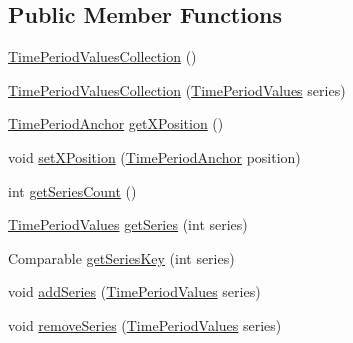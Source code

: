 \subsection*{Public Member Functions}
\begin{DoxyCompactItemize}
\item 
\mbox{\hyperlink{classorg_1_1jfree_1_1data_1_1time_1_1_time_period_values_collection_acf9def57d7c4985e34a022baeaea368b}{Time\+Period\+Values\+Collection}} ()
\item 
\mbox{\hyperlink{classorg_1_1jfree_1_1data_1_1time_1_1_time_period_values_collection_a0ddb82b9ba460887c9f09f1cba7df670}{Time\+Period\+Values\+Collection}} (\mbox{\hyperlink{classorg_1_1jfree_1_1data_1_1time_1_1_time_period_values}{Time\+Period\+Values}} series)
\item 
\mbox{\hyperlink{classorg_1_1jfree_1_1data_1_1time_1_1_time_period_anchor}{Time\+Period\+Anchor}} \mbox{\hyperlink{classorg_1_1jfree_1_1data_1_1time_1_1_time_period_values_collection_ae373cb525647af8dade90e59920acb78}{get\+X\+Position}} ()
\item 
void \mbox{\hyperlink{classorg_1_1jfree_1_1data_1_1time_1_1_time_period_values_collection_aa959881c9c70b7a2da63870fd8ebdfe4}{set\+X\+Position}} (\mbox{\hyperlink{classorg_1_1jfree_1_1data_1_1time_1_1_time_period_anchor}{Time\+Period\+Anchor}} position)
\item 
int \mbox{\hyperlink{classorg_1_1jfree_1_1data_1_1time_1_1_time_period_values_collection_a351ca777d6bd5649338306297d87c377}{get\+Series\+Count}} ()
\item 
\mbox{\hyperlink{classorg_1_1jfree_1_1data_1_1time_1_1_time_period_values}{Time\+Period\+Values}} \mbox{\hyperlink{classorg_1_1jfree_1_1data_1_1time_1_1_time_period_values_collection_a262089f3636775f2d84ebf9efec51b6f}{get\+Series}} (int series)
\item 
Comparable \mbox{\hyperlink{classorg_1_1jfree_1_1data_1_1time_1_1_time_period_values_collection_a432f205f15ffa8b9aacbcb4c77e5afd3}{get\+Series\+Key}} (int series)
\item 
void \mbox{\hyperlink{classorg_1_1jfree_1_1data_1_1time_1_1_time_period_values_collection_a7dcd1415c748630f4c2829a24d7e095b}{add\+Series}} (\mbox{\hyperlink{classorg_1_1jfree_1_1data_1_1time_1_1_time_period_values}{Time\+Period\+Values}} series)
\item 
void \mbox{\hyperlink{classorg_1_1jfree_1_1data_1_1time_1_1_time_period_values_collection_ab429d9ab476c9ce6bc69c7f6dc4a77be}{remove\+Series}} (\mbox{\hyperlink{classorg_1_1jfree_1_1data_1_1time_1_1_time_period_values}{Time\+Period\+Values}} series)

\end{DoxyCompactItemize}
